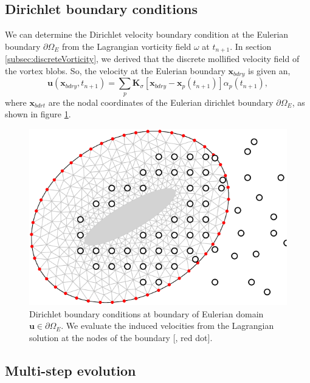\subsection{Dirichlet boundary conditions}
\label{subsec:dbc}
We can determine the Dirichlet velocity boundary condition at the Eulerian boundary $\partial \Omega_E$ from the Lagrangian vorticity field $\omega$ at $t_{n+1}$. In section \ref{subsec:discreteVorticity}, we derived that the discrete mollified velocity field of the vortex blobs. So, the velocity at the Eulerian boundary $\mathbf{x}_{bdry}$ is given an,
\begin{equation}
\mathbf{u}(\mathbf{x}_{bdry},t_{n+1}) = \sum_p \mathbf{K}_{\sigma}[\mathbf{x}_{bdry} - \mathbf{x}_p(t_{n+1})]\alpha_p(t_{n+1}),
\end{equation}
where $\mathbf{x}_{bdrt}$ are the nodal coordinates of the Eulerian dirichlet boundary $\partial \Omega_E$, as shown in figure \ref{fig:eulerianDirichletBC}.

	\begin{figure}[!t]
	\centering
	\includegraphics[width=0.5\linewidth]{./figures/hybrid/interpolation/ellipse/eulerianDirichletBC-crop.pdf}
	\caption{Dirichlet boundary conditions at boundary of Eulerian domain $\mathbf{u} \in \partial \Omega_E$. We evaluate the induced velocities from the Lagrangian solution at the nodes of the boundary  [{\color{plotRed}{$\bullet$}}, red dot].}
	\label{fig:eulerianDirichletBC}
	\end{figure}	


\subsection{Multi-step evolution}

